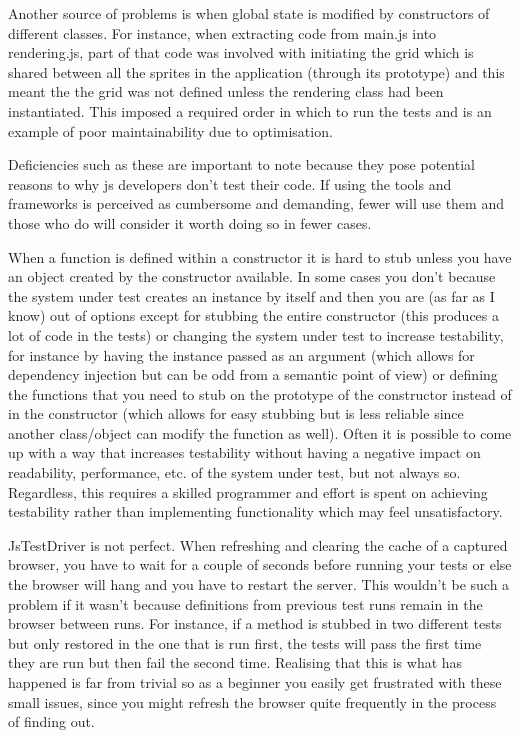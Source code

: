 \documentclass[11pt]{article}
\begin{document}
Another source of problems is when global state is modified by constructors of different classes. For instance, when extracting code from main.js into rendering.js, part of that code was involved with initiating the grid which is shared between all the sprites in the application (through its prototype) and this meant the the grid was not defined unless the rendering class had been instantiated. This imposed a required order in which to run the tests and is an example of poor maintainability due to optimisation.

Deficiencies such as these are important to note because they pose potential reasons to why \gls{js} developers don't test their code. If using the tools and frameworks is perceived as cumbersome and demanding, fewer will use them and those who do will consider it worth doing so in fewer cases.

When a function is defined within a constructor it is hard to stub unless you have an object created by the constructor available. In some cases you don't because the system under test creates an instance by itself and then you are (as far as I know) out of options except for stubbing the entire constructor (this produces a lot of code in the tests) or changing the system under test to increase testability, for instance by having the instance passed as an argument (which allows for dependency injection but can be odd from a semantic point of view) or defining the functions that you need to stub on the prototype of the constructor instead of in the constructor (which allows for easy stubbing but is less reliable since another class/object can modify the function as well). Often it is possible to come up with a way that increases testability without having a negative impact on readability, performance, etc. of the system under test, but not always so. Regardless, this requires a skilled programmer and effort is spent on achieving testability rather than implementing functionality which may feel unsatisfactory.

JsTestDriver is not perfect. When refreshing and clearing the cache of a captured browser, you have to wait for a couple of seconds before running your tests or else the browser will hang and you have to restart the server. This wouldn't be such a problem if it wasn't because definitions from previous test runs remain in the browser between runs. For instance, if a method is stubbed in two different tests but only restored in the one that is run first, the tests will pass the first time they are run but then fail the second time. Realising that this is what has happened is far from trivial so as a beginner you easily get frustrated with these small issues, since you might refresh the browser quite frequently in the process of finding out.
\end{document}
